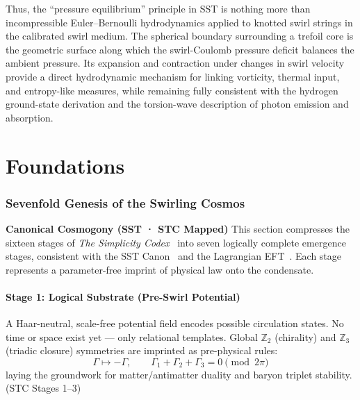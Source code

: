 \documentclass[10pt,reprint,aps,onecolumn,nofootinbib]{revtex4-2}
\begin{document}
        Thus, the ``pressure equilibrium'' principle in SST is nothing more than incompressible Euler--Bernoulli hydrodynamics applied to knotted swirl strings in the calibrated swirl medium. The spherical boundary surrounding a trefoil core is the geometric surface along which the swirl-Coulomb pressure deficit balances the ambient pressure. Its expansion and contraction under changes in swirl velocity provide a direct hydrodynamic mechanism for linking vorticity, thermal input, and entropy-like measures, while remaining fully consistent with the hydrogen ground-state derivation and the torsion-wave description of photon emission and absorption.






\part{Foundations}

\section{Sevenfold Genesis of the Swirling Cosmos}
\label{sec:sevenfold-genesis}

\noindent
\textbf{Canonical Cosmogony (SST · STC Mapped)}
This section compresses the sixteen stages of \emph{The Simplicity Codex}~\cite{Goldau2025_STC}
into seven logically complete emergence stages, consistent with the SST Canon~\canonversion{}
and the Lagrangian EFT~\cite{Iskandarani2025_Lagrangian}.
Each stage represents a parameter-free imprint of physical law onto the condensate.

\subsection*{Stage 1: Logical Substrate (Pre-Swirl Potential)}
A Haar-neutral, scale-free potential field encodes possible circulation states.
No time or space exist yet — only relational templates.
Global $\mathbb{Z}_2$ (chirality) and $\mathbb{Z}_3$ (triadic closure) symmetries are imprinted as pre-physical rules:
\[
\Gamma \mapsto -\Gamma,
\qquad
\Gamma_1 + \Gamma_2 + \Gamma_3 = 0 \pmod{2\pi}
\]
laying the groundwork for matter/antimatter duality and baryon triplet stability.
\hfill (STC Stages 1–3)
\end{document}
